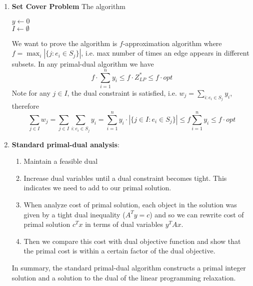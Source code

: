 \documentclass[11pt]{article}
\begin{document}
\begin{enumerate}
    \item \textbf{Set Cover Problem} The algorithm \\ 
    \begin{algorithm}[H]
        $y\leftarrow 0$ \\
        $I \leftarrow \emptyset$ \\
    \end{algorithm}
    We want to prove the algorithm is $f$-approximation algorithm where $f = \max_i | \{ j : e_i \in S_j \} |$, i.e. max number of times an edge appears in different subsets. In any primal-dual algorithm we have 
    \[
       f \cdot \sum_{i=1}^n y_i \leq f\cdot Z^*_{LP} \leq f\cdot opt    
    \]
    Note for any $j\in I$, the dual constraint is satisfied, i.e. $w_j = \textstyle \sum_{i:e_i \in S_j} y_i$, therefore 
    \[
        \sum_{j\in I} w_j = \sum_{j\in I} \sum_{i:e_i\in S_j} y_i 
        = \sum_{i=1}^n y_i \cdot |\{j\in I: e_i \in S_j\}|    
        \leq f \sum_{i=1}^n y_i \leq f \cdot opt
    \]
    \item \textbf{Standard primal-dual analysis}:
    \begin{enumerate}
        \item Maintain a feasible dual
        \item Increase dual variables until a dual constraint becomes tight. This indicates we need to add to our primal solution.
        \item When analyze cost of primal solution, each object in the solution was given by a tight dual inequality ($A^T y = c$) and so we can rewrite cost of primal solution $c^Tx$ in terms of dual variables $y^T A x$.
        \item Then we compare this cost with dual objective function and show that the primal cost is within a certain factor of the dual objective. 
    \end{enumerate}
    In summary, the standard primal-dual algorithm constructs a primal integer solution and a solution to the dual of the linear programming relaxation. 

\end{enumerate}
\end{document}
